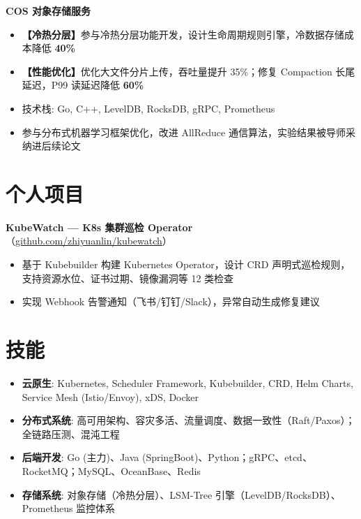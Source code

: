 \documentclass{resume}
\begin{document}

\textbf{COS 对象存储服务}
\begin{itemize}[parsep=0.25ex]
      \item \textbf{【冷热分层】}参与冷热分层功能开发，设计生命周期规则引擎，冷数据存储成本降低 \textbf{40\%}
      \item \textbf{【性能优化】}优化大文件分片上传，吞吐量提升 35\%；修复 Compaction 长尾延迟，P99 读延迟降低 \textbf{60\%}
      \item 技术栈: Go, C++, LevelDB, RocksDB, gRPC, Prometheus
\end{itemize}

\begin{itemize}[parsep=0.25ex]
      \item 参与分布式机器学习框架优化，改进 AllReduce 通信算法，实验结果被导师采纳进后续论文
\end{itemize}

\section{个人项目}

\textbf{KubeWatch — K8s 集群巡检 Operator}（\href{https://github.com/zhiyuanlin/kubewatch}{github.com/zhiyuanlin/kubewatch}）
\begin{itemize}[parsep=0.25ex]
      \item 基于 Kubebuilder 构建 Kubernetes Operator，设计 CRD 声明式巡检规则，支持资源水位、证书过期、镜像漏洞等 12 类检查
      \item 实现 Webhook 告警通知（飞书/钉钉/Slack），异常自动生成修复建议
\end{itemize}

\section{技能}
\begin{itemize}[parsep=0.25ex]
      \item \textbf{云原生}: Kubernetes, Scheduler Framework, Kubebuilder, CRD, Helm Charts, Service Mesh (Istio/Envoy), xDS, Docker
      \item \textbf{分布式系统}: 高可用架构、容灾多活、流量调度、数据一致性（Raft/Paxos）；全链路压测、混沌工程
      \item \textbf{后端开发}: Go (主力)、Java (SpringBoot)、Python；gRPC、etcd、RocketMQ；MySQL、OceanBase、Redis
      \item \textbf{存储系统}: 对象存储（冷热分层）、LSM-Tree 引擎（LevelDB/RocksDB）、Prometheus 监控体系
\end{itemize}
\end{document}
